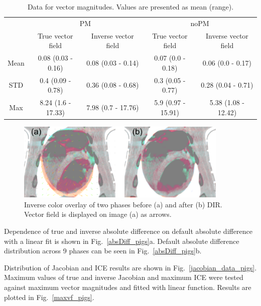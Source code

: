 \begin{table}[H]
  \centering
  \caption{Data for vector magnitudes. Values are presented as mean (range).}
  \begin{tabular}{c|c|c|c|c}
	    & \multicolumn{2}{|c|}{PM} & \multicolumn{2}{|c}{noPM} \\
  
            & True vector field   & Inverse vector field   & True vector field  & Inverse vector field \\
       \hline
	Mean & 0.08 (0.03 - 0.16) & 0.08 (0.03 - 0.14) & 0.07 (0.0 - 0.18)  & 0.06 (0.0 - 0.17) \\ 
	STD  & 0.4 (0.09 - 0.78)  & 0.36 (0.08 - 0.68) & 0.3 (0.05 - 0.77)  & 0.28 (0.04 - 0.71) \\ 
	Max  & 8.24 (1.6 - 17.33) & 7.98 (0.7 - 17.76) & 5.9 (0.97 - 15.91) & 5.38 (1.08 - 12.42) \\ 
    \hline\hline
  \end{tabular}
  \label{tab:vectordata_pig}
\end{table}

\begin{figure}[H]
	\begin{center}		
		\includegraphics[width=0.9\textwidth]{./VisualMotionManagment/Images/exampleReg_pigs.png}
		\caption{Inverse color overlay of two phases before (a) and after (b) DIR. Vector field is displayed on image (a) as arrows.}
		\label{exampleReg_pigs}
	\end{center}
\end{figure}

Dependence of true and inverse absolute difference on default absolute difference with a linear fit is shown in Fig.~\ref{absDiff_pigs}a. 
Default absolute difference distribution across 9 phases can be seen in Fig.~\ref{absDiff_pigs}b.

Distribution of Jacobian and ICE results are shown in Fig.~\ref{jacobian_data_pigs}. Maximum values of true and inverse Jacobian and maximum ICE were
tested against maximum vector magnitudes and fitted with linear function. Results are plotted in Fig.~\ref{maxvf_pigs}.


